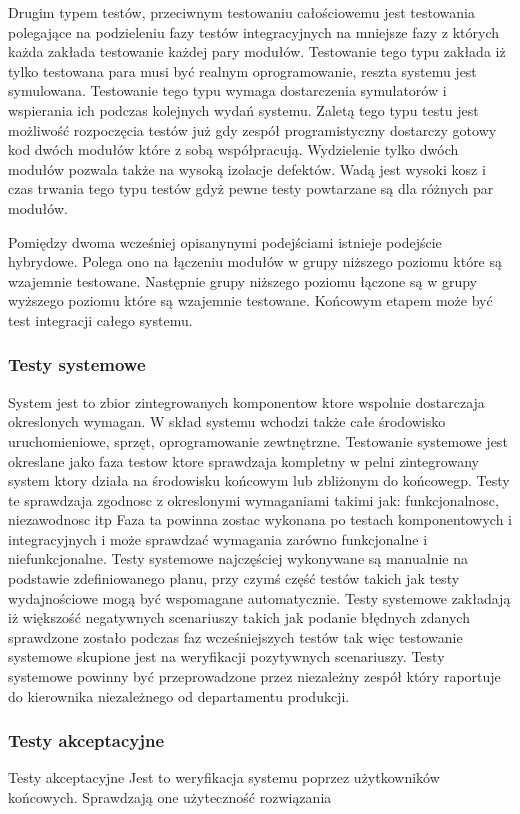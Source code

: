 Drugim typem testów, przeciwnym testowaniu całościowemu jest testowania polegające na podzieleniu fazy testów integracyjnych na mniejsze fazy z których każda zakłada testowanie każdej pary modułów. Testowanie tego typu zakłada iż tylko testowana para musi być realnym oprogramowanie, reszta systemu jest symulowana. Testowanie tego typu wymaga dostarczenia symulatorów i wspierania ich podczas kolejnych wydań systemu. Zaletą tego typu testu jest możliwość rozpoczęcia testów już gdy zespół programistyczny dostarczy gotowy kod dwóch modułów które z sobą współpracują. Wydzielenie tylko dwóch modułów pozwala także na wysoką izolacje defektów. Wadą jest wysoki kosz i czas trwania tego typu testów gdyż pewne testy powtarzane są dla różnych par modułów.

Pomiędzy dwoma wcześniej opisanynymi podejściami istnieje podejście hybrydowe. Polega ono na łączeniu modułów w grupy niższego poziomu które są wzajemnie testowane. Następnie grupy niższego poziomu łączone są w grupy wyższego poziomu które są wzajemnie testowane. Końcowym etapem może być test integracji całego systemu.
\subsubsection{Testy systemowe}
System jest to zbior zintegrowanych komponentow ktore wspolnie dostarczaja okreslonych wymagan. W skład systemu wchodzi także całe środowisko uruchomieniowe, sprzęt, oprogramowanie zewtnętrzne. Testowanie systemowe jest okreslane jako faza testow ktore sprawdzaja kompletny w pelni zintegrowany system ktory działa na środowisku końcowym lub zbliżonym do końcowegp. Testy te sprawdzaja zgodnosc z okreslonymi wymaganiami takimi jak: funkcjonalnosc, niezawodnosc itp
Faza ta powinna zostac wykonana po testach komponentowych i integracyjnych i może sprawdzać wymagania zarówno funkcjonalne i niefunkcjonalne.
Testy systemowe najczęściej wykonywane są manualnie na podstawie zdefiniowanego planu, przy czymś część testów takich jak testy wydajnościowe mogą być wspomagane automatycznie.
Testy systemowe zakładają iż większość negatywnych scenariuszy takich jak podanie błędnych zdanych sprawdzone zostało podczas faz wcześniejszych testów tak więc testowanie systemowe skupione jest na weryfikacji pozytywnych scenariuszy. 
Testy systemowe powinny być przeprowadzone przez niezależny zespół który raportuje do kierownika niezależnego od departamentu produkcji. 

\subsubsection{Testy akceptacyjne}
Testy akceptacyjne
Jest to weryfikacja systemu poprzez użytkowników końcowych. Sprawdzają one użyteczność rozwiązania

